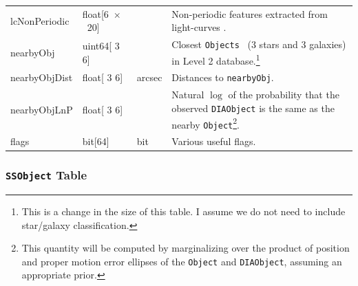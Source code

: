 \documentclass[12pt]{article}
\newcommand\x         {\hbox{$\times$}}
\newcommand{\B}[1]{{\color{blue} #1}}
\newcommand{\R}[1]{{\color{red} #1}}
\newcommand{\code}[1]{\texttt{#1}}
\newcommand{\DIAObject}{\code{DIAObject}\xspace}
\newcommand{\DR}{{Level 2 database}\xspace}
\newcommand{\Object}{\code{Object}\xspace}
\newcommand{\Objects}{\code{Objects}\xspace}
\newcommand{\SSObject}{\code{SSObject}\xspace}
\newcommand{\req}[1]{\marginpar{\tiny #1}}
\newcommand{\dmreq}[1]{\req{DMS-REQ-#1}}
\begin{document}
\begin{center}
\begin{longtable}{p{3cm}p{2cm}p{2cm}p{5cm}}
lcNonPeriodic & float[6~\x~20] & ~ & Non-periodic features extracted from light-curves \citep[Table~5,][]{2011ApJ...733...10R}. \\

nearbyObj   & uint64[\R{3}\B{6}] & ~ & Closest \Objects\ \B{(3 stars and 3 galaxies)} in \DR.\footnote{\color{magenta} This is a change in the size of this table. I assume we do not need to include star/galaxy classification.} \\

nearbyObjDist   & float[\R{3}\B{6}] & arcsec & Distances to \texttt{nearbyObj}. \\

nearbyObjLnP   & float[\R{3}\B{6}] & ~ &  Natural $\log$ of the probability that the observed \DIAObject is the same as the nearby \Object\footnote{This quantity will be computed by marginalizing over the product of position and proper motion error ellipses of the \Object and \DIAObject, assuming an appropriate prior.}. \\

flags & bit[64] & bit & Various useful flags. \\ \hline

\end{longtable}
\end{center}

\subsubsection{\SSObject Table}

\dmreq{0273}
\end{document}

